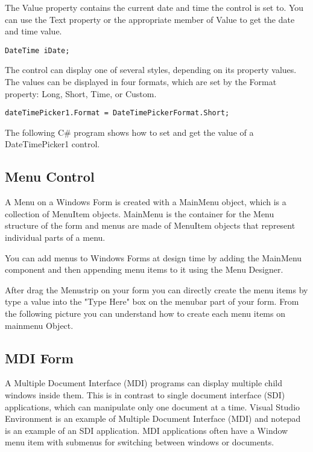 The Value property contains the current date and time the control is set to. You can use the Text property or the appropriate member of Value to get the date and time value.

\begin{lstlisting}[numbers=none]
DateTime iDate;
\end{lstlisting}
	
The control can display one of several styles, depending on its property values. The values can be displayed in four formats, which are set by the Format property: Long, Short, Time, or Custom.

\begin{lstlisting}[numbers=none]
dateTimePicker1.Format = DateTimePickerFormat.Short;
\end{lstlisting}

The following C\# program shows how to set and get the value of a DateTimePicker1 control.



\subsection{Menu Control}
A Menu on a Windows Form is created with a MainMenu object, which is a collection of MenuItem objects. MainMenu is the container for the Menu structure of the form and menus are made of MenuItem objects that represent individual parts of a menu.

You can add menus to Windows Forms at design time by adding the MainMenu component and then appending menu items to it using the Menu Designer.

After drag the Menustrip on your form you can directly create the menu items by type a value into the "Type Here" box on the menubar part of your form. From the following picture you can understand how to create each menu items on mainmenu Object.


\subsection{MDI Form}
A Multiple Document Interface (MDI) programs can display multiple child windows inside them. This is in contrast to single document interface (SDI) applications, which can manipulate only one document at a time. Visual Studio Environment is an example of Multiple Document Interface (MDI) and notepad is an example of an SDI application. MDI applications often have a Window menu item with submenus for switching between windows or documents.



